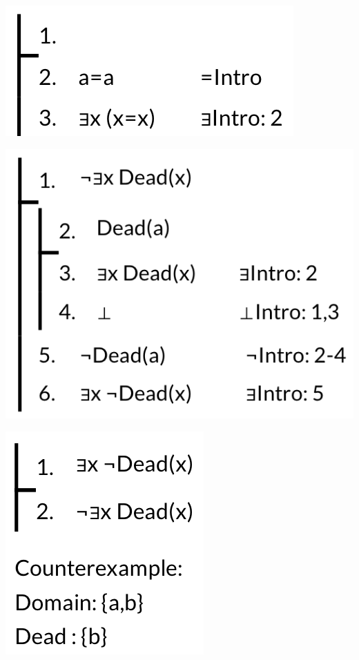 \documentclass[12pt]{extarticle}
\begin{document}
\begin{multicols*}{3}
\begin{center}
\includegraphics[scale=0.3]{img/unit_605_prf1.png}
\end{center}
\begin{center}
\includegraphics[scale=0.3]{img/unit_605_prf2.png}
\end{center}
\begin{center}
\includegraphics[scale=0.3]{img/unit_605_counterexample.png}
\end{center}
 

\end{multicols*}
\end{document}
